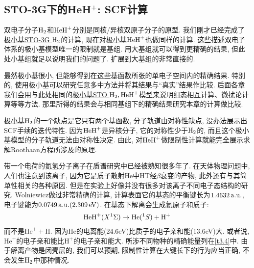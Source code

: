 \subsection{STO-3G下的HeH$^+$: SCF计算}
双电子分子$\mathrm{H}_2$和$\mathrm{HeH}^+$分别是同核/异核双原子分子的原型. 我们刚才已经完成了\underline{极小基STO-3G $\mathrm{H}_2$}的计算, 现在对\underline{极小基$\mathrm{HeH}^+$}也做同样的计算. 这些描述双电子体系的极小基模型唯一的限制就是基组. 用大基组就可以得到更精确的结果, 但此处小基组就足以说明我们的问题了. 扩展到大基组的非常直接的. 

最然极小基很小, 但能够得到在这些基函数所张的单电子空间内的精确结果. 特别的, 使用极小基可以研究任意多中方法并将其结果与``真实''结果作比较. 后面各章我们会用与此处相同的\underline{极小基STO $\mathrm{H}_2,\mathrm{HeH}^+$}模型来说明组态相互计算、微扰论计算等等方法. 那里所得的结果会与相同基组下的精确结果研究本章的\hft 计算做比较.

\underline{极小基$\mathrm{H}_2$}的一个缺点是它只有两个基函数, 分子轨道由对称性缺点, 没办法展示出SCF手续的迭代特性. 因为$\mathrm{HeH}^+$是异核分子, 它的对称性少于$\mathrm{H}_2$的, 而且这个极小基模型的分子轨道无法由对称性决定. 由此, 对$\mathrm{HeH}^+$做限制性\hft 计算就能完全展示求解Roothaan方程所涉及的原理. 

带一个电荷的氦氢分子离子在质谱研究中已经被熟知很多年了. 在天体物理问题中, 人们也注意到该离子, 因为它是质子散射$\mathrm{He}$中$\mathrm{HT}$经$\beta$衰变的产物, 此外还有与其简单性相关的各种原因. 但是在实验上好像并没有很多对该离子不同电子态结构的研究. Wolniewicz做过非常精确的计算, 计算表面它的基态的平衡键长为$1.4632\,\mathrm{a.u.}$, 电子键能为$0.0749\,\mathrm{a.u.}(2.309\,\mathrm{eV})$. 在基态下解离会生成氦原子和质子:
\begin{align}
\mathrm{HeH}^+(X^1\Sigma) \to \mathrm{He}(^1S) + \mathrm{H}^+
\end{align}
而不是$\mathrm{He}^+ + \mathrm{H}$. 因为$\mathrm{He}$的电离能(24.6eV)比质子的电子亲和能(13.6eV)大. 或者说, $\mathrm{He}^+$的电子亲和能比$\mathrm{H}^+$的电子亲和能大. 所涉不同物种的精确能量列在\ref{t3.4}中. 由于解离产物是闭壳层的, 我们可以预期, 限制性\hft 计算在大键长下的行为应当正确, 不会发生$\mathrm{H}_2$中那种情况. 

